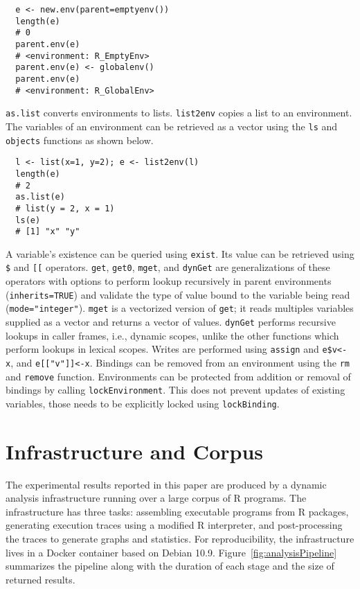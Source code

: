 \documentclass[10pt,review,sigplan,authorversion=true]{acmart}
\renewcommand{\c}[1]{\lstinline |#1|\xspace}
\newcommand{\asList}{\c{as.list}}
\newcommand{\listToEnv}{\c{list2env}}
\newcommand{\ls}{\c{ls}}
\newcommand{\objects}{\c{objects}}
\newcommand{\subDollar}{\c{$}}
\newcommand{\subBracket}{\c{[[}}
\newcommand{\exist}{\c{exist}}
\newcommand{\get}{\c{get}}
\newcommand{\getZero}{\c{get0}}
\newcommand{\mget}{\c{mget}}
\newcommand{\dynGet}{\c{dynGet}}
\newcommand{\assign}{\c{assign}}
\newcommand{\remove}{\c{remove}}
\renewcommand{\rm}{\c{rm}}
\newcommand{\lockEnvironment}{\c{lockEnvironment}}
\newcommand{\lockBinding}{\c{lockBinding}}
\begin{document}
\begin{lstlisting}
  e <- new.env(parent=emptyenv())
  length(e)
  # 0
  parent.env(e)
  # <environment: R_EmptyEnv>
  parent.env(e) <- globalenv()
  parent.env(e)
  # <environment: R_GlobalEnv>
\end{lstlisting}

\noindent
\asList converts environments to lists. \listToEnv copies a list to an
environment. The variables of an environment can be retrieved as a vector using
the \ls and \objects functions as shown below.

\begin{lstlisting}
  l <- list(x=1, y=2); e <- list2env(l)
  length(e)
  # 2
  as.list(e)
  # list(y = 2, x = 1)
  ls(e)
  # [1] "x" "y"
\end{lstlisting}

\noindent
A variable's existence can be queried using \exist. Its value can be retrieved
using \subDollar and \subBracket operators. \get, \getZero, \mget, and \dynGet
are generalizations of these operators with options to perform lookup
recursively in parent environments (\c{inherits=TRUE}) and validate the type of
value bound to the variable being read (\c{mode="integer"}). \mget is a
vectorized version of \get; it reads multiples variables supplied as a vector
and returns a vector of values. \dynGet performs recursive lookups in caller
frames, i.e., dynamic scopes, unlike the other functions which perform lookups
in lexical scopes. Writes are performed using \assign and \c{e$v<-x}, and
\c{e[["v"]]<-x}. Bindings can be removed from an environment using the \rm and
\remove function.
Environments can be protected from addition or removal of bindings by calling
\lockEnvironment. This does not prevent updates of existing variables, those
needs to be explicitly locked using \lockBinding.


\section{Infrastructure and Corpus}

The experimental results reported in this paper are produced by a dynamic
analysis infrastructure running over a large corpus of R programs. The
infrastructure has three tasks: assembling executable programs from R packages,
generating execution traces using a modified R interpreter, and post-processing
the traces to generate graphs and statistics. For reproducibility, the
infrastructure lives in a Docker container based on Debian 10.9.
Figure~\ref{fig:analysisPipeline} summarizes the pipeline along with the
duration of each stage and the size of returned results.
\end{document}
